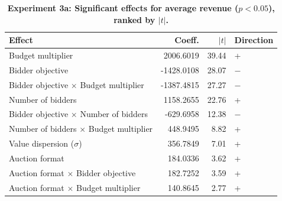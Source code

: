 \begin{table}[H]
\centering
\caption[Experiment 3a: Significant effects for average revenue ($p < 0.05$), ranked by $|t|$]{\textbf{Experiment 3a: Significant effects for average revenue ($p < 0.05$), ranked by $|t|$.}}
\label{tab:exp3a_ranked_rev}
\begin{tabular}{lrrl}
\toprule
\textbf{Effect} & \textbf{Coeff.} & \textbf{$|t|$} & \textbf{Direction} \\
\midrule
Budget multiplier & 2006.6019 & 39.44 & + \\
Bidder objective & -1428.0108 & 28.07 & $-$ \\
Bidder objective $\times$ Budget multiplier & -1387.4815 & 27.27 & $-$ \\
Number of bidders & 1158.2655 & 22.76 & + \\
Bidder objective $\times$ Number of bidders & -629.6958 & 12.38 & $-$ \\
Number of bidders $\times$ Budget multiplier & 448.9495 & 8.82 & + \\
Value dispersion ($\sigma$) & 356.7849 & 7.01 & + \\
Auction format & 184.0336 & 3.62 & + \\
Auction format $\times$ Bidder objective & 182.7252 & 3.59 & + \\
Auction format $\times$ Budget multiplier & 140.8645 & 2.77 & + \\
\bottomrule
\end{tabular}
\end{table}
